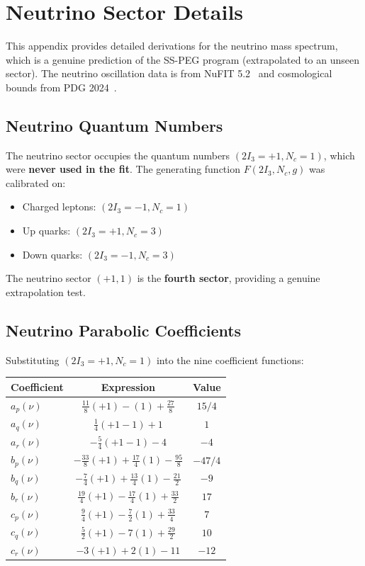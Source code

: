 \section{Neutrino Sector Details}\label{app:neutrino_details}

This appendix provides detailed derivations for the neutrino mass spectrum, which is a genuine prediction of the SS-PEG program (extrapolated to an unseen sector). The neutrino oscillation data is from NuFIT 5.2~\cite{nufit52} and cosmological bounds from PDG 2024~\cite{pdg2024}.

\subsection{Neutrino Quantum Numbers}\label{app:nu_qn}

The neutrino sector occupies the quantum numbers $(2I_3 = +1, N_c = 1)$, which were \textbf{never used in the fit}. The generating function $F(2I_3, N_c, g)$ was calibrated on:
\begin{itemize}
\item Charged leptons: $(2I_3 = -1, N_c = 1)$
\item Up quarks: $(2I_3 = +1, N_c = 3)$
\item Down quarks: $(2I_3 = -1, N_c = 3)$
\end{itemize}

The neutrino sector $(+1, 1)$ is the \textbf{fourth sector}, providing a genuine extrapolation test.

\subsection{Neutrino Parabolic Coefficients}\label{app:nu_coeffs}

Substituting $(2I_3 = +1, N_c = 1)$ into the nine coefficient functions:

\begin{center}
\label{tab:nu_coeffs}
\begin{tabular}{lcc}
\hline\hline
Coefficient & Expression & Value \\
\hline
$a_p(\nu)$ & $\frac{11}{8}(+1) - (1) + \frac{27}{8}$ & $15/4$ \\
$a_q(\nu)$ & $\frac{1}{4}(+1 - 1) + 1$ & $1$ \\
$a_r(\nu)$ & $-\frac{5}{4}(+1 - 1) - 4$ & $-4$ \\
$b_p(\nu)$ & $-\frac{33}{8}(+1) + \frac{17}{4}(1) - \frac{95}{8}$ & $-47/4$ \\
$b_q(\nu)$ & $-\frac{7}{4}(+1) + \frac{13}{4}(1) - \frac{21}{2}$ & $-9$ \\
$b_r(\nu)$ & $\frac{19}{4}(+1) - \frac{17}{4}(1) + \frac{33}{2}$ & $17$ \\
$c_p(\nu)$ & $\frac{9}{4}(+1) - \frac{7}{2}(1) + \frac{33}{4}$ & $7$ \\
$c_q(\nu)$ & $\frac{5}{2}(+1) - 7(1) + \frac{29}{2}$ & $10$ \\
$c_r(\nu)$ & $-3(+1) + 2(1) - 11$ & $-12$ \\
\hline\hline
\end{tabular}
\end{center}

